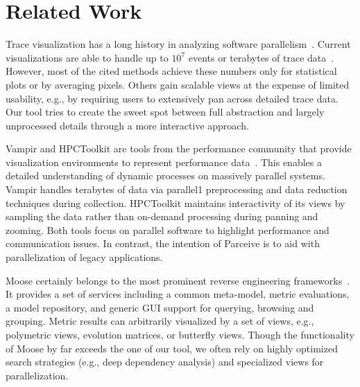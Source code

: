 \section{Related Work}
\label{sec:related_work}
Trace visualization has a long history in analyzing software
parallelism~\cite{TraceVisualization}. Current visualizations are able to
handle up to $10^7$ events or terabytes of trace data~\cite{State}. However,
most of the cited methods achieve these numbers only for statistical plots or
by averaging pixels. Others gain scalable views at the expense of limited
usability, e.g., by requiring users to extensively pan across detailed trace
data. Our tool tries to create the sweet spot between full abstraction and
largely unprocessed details through a more interactive approach.

Vampir and HPCToolkit are tools from the performance community that provide
visualization environments to represent performance data~\cite{Vampir,
HPCToolkit}. This enables a detailed understanding of dynamic processes on
massively parallel systems. Vampir handles terabytes of data via parallel1
preprocessing and data reduction techniques during collection. HPCToolkit
maintains interactivity of its views by sampling the data rather than on-demand
processing during panning and zooming. Both tools focus on parallel software to
highlight performance and communication issues. In contrast, the intention of
Parceive is to aid with parallelization of legacy applications.

Moose certainly belongs to the most prominent reverse engineering
frameworks~\cite{Moose}. It provides a set of services including a common
meta-model, metric evaluations, a model repository, and generic GUI support for
querying, browsing and grouping. Metric results can arbitrarily visualized by a
set of views, e.g., polymetric views, evolution matrices, or butterfly views.
Though the functionality of Moose by far exceeds the one of our tool, we often
rely on highly optimized search strategies (e.g., deep dependency analysis) and
specialized views for parallelization.